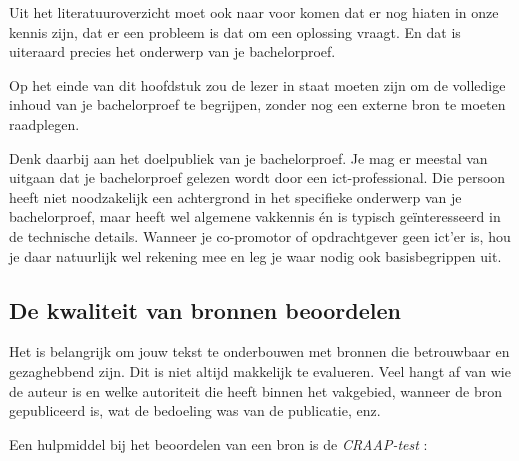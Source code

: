 Uit het literatuuroverzicht moet ook naar voor komen dat er nog hiaten in onze kennis zijn, dat er een probleem is dat om een oplossing vraagt. En dat is uiteraard precies het onderwerp van je bachelorproef.

Op het einde van dit hoofdstuk zou de lezer in staat moeten zijn om de volledige inhoud van je bachelorproef te begrijpen, zonder nog een externe bron te moeten raadplegen. 

Denk daarbij aan het doelpubliek van je bachelorproef. Je mag er meestal van uitgaan dat je bachelorproef gelezen wordt door een ict-professional. Die persoon heeft niet noodzakelijk een achtergrond in het specifieke onderwerp van je bachelorproef, maar heeft wel algemene vakkennis én is typisch geïnteresseerd in de technische details. Wanneer je co-promotor of opdrachtgever geen ict'er is, hou je daar natuurlijk wel rekening mee en leg je waar nodig ook basisbegrippen uit.

\subsection{De kwaliteit van bronnen beoordelen}%
\label{sub:de-kwaliteit-van-bronnen-beoordelen}

Het is belangrijk om jouw tekst te onderbouwen met bronnen die betrouwbaar en gezaghebbend zijn. Dit is niet altijd makkelijk te evalueren. Veel hangt af van wie de auteur is en welke autoriteit die heeft binnen het vakgebied, wanneer de bron gepubliceerd is, wat de bedoeling was van de publicatie, enz.

Een hulpmiddel bij het beoordelen van een bron is de \emph{CRAAP-test} \autocite{Blakeslee2004}:

